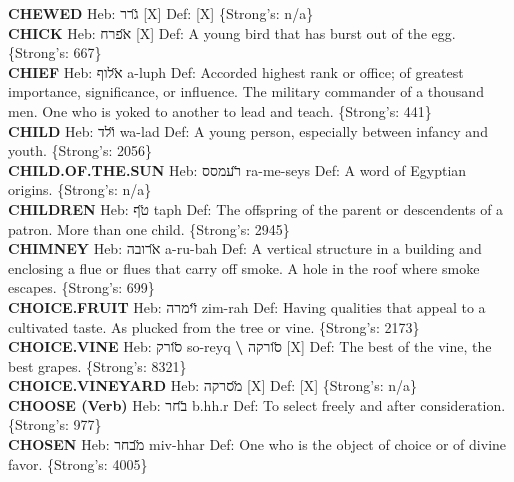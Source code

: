 {\textbf{CHEWED} Heb: {\large\H גרר} {[}X{]} Def: {[}X{]} \{Strong's: n/a\}\hfill{}\\

\textbf{CHICK} Heb: {\large\H אפרח} {[}X{]} Def: A young bird that has burst out of the egg. \{Strong's: 667\}\hfill{}\\

\textbf{CHIEF} Heb: {\large\H אלוף} a-luph Def: Accorded highest rank or office; of greatest importance, significance, or influence. The military commander of a thousand men. One who is yoked to another to lead and teach. \{Strong's: 441\}\hfill{}\\

\textbf{CHILD} Heb: {\large\H ולד} wa-lad Def: A young person, especially between infancy and youth. \{Strong's: 2056\}\hfill{}\\

\textbf{CHILD.OF.THE.SUN} Heb: {\large\H רעמסס} ra-me-seys Def: A word of Egyptian origins. \{Strong's: n/a\}\hfill{}\\

\textbf{CHILDREN} Heb: {\large\H טף} taph Def: The offspring of the parent or descendents of a patron. More than one child. \{Strong's: 2945\}\hfill{}\\

\textbf{CHIMNEY} Heb: {\large\H ארובה} a-ru-bah Def: A vertical structure in a building and enclosing a flue or flues that carry off smoke. A hole in the roof where smoke escapes. \{Strong's: 699\}\hfill{}\\

\textbf{CHOICE.FRUIT} Heb: {\large\H זימרה} zim-rah Def: Having qualities that appeal to a cultivated taste. As plucked from the tree or vine. \{Strong's: 2173\}\hfill{}\\

\textbf{CHOICE.VINE} Heb: {\large\H סורק} so-reyq \textbf{\textbackslash{}} {\large\H סורקה} {[}X{]} Def: The best of the vine, the best grapes. \{Strong's: 8321\}\hfill{}\\

\textbf{CHOICE.VINEYARD} Heb: {\large\H מסרקה} {[}X{]} Def: {[}X{]} \{Strong's: n/a\}\hfill{}\\

\textbf{CHOOSE (Verb)} Heb: {\large\H בחר} b.hh.r Def: To select freely and after consideration. \{Strong's: 977\}\hfill{}\\

\textbf{CHOSEN} Heb: {\large\H מבחר} miv-hhar Def: One who is the object of choice or of divine favor. \{Strong's: 4005\}\hfill{}\\

}
